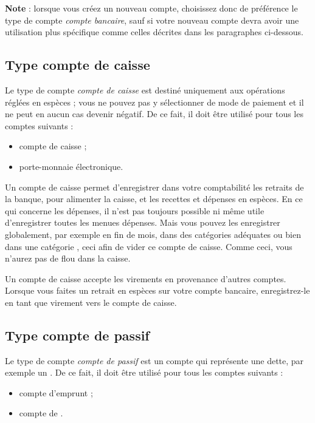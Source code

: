 \textbf{Note} : lorsque vous créez un nouveau compte, choisissez donc de préférence le type de compte \emph{compte bancaire}, sauf si votre nouveau compte devra avoir une utilisation plus spécifique comme celles décrites dans les paragraphes ci-dessous.


\subsection{Type compte de caisse\label{accounts-type-cash}}

Le type de compte \emph{compte de caisse} est destiné uniquement aux opérations réglées en espèces ; vous ne pouvez pas y sélectionner de mode de paiement et il ne peut en aucun cas devenir négatif. De ce fait, il doit être utilisé pour tous les comptes suivants :
\begin{itemize}
	\item compte de caisse ;
	\item porte-monnaie électronique. 
\end{itemize}

Un compte de caisse permet d'enregistrer dans votre comptabilité les retraits de la banque, pour alimenter la caisse, et les recettes et dépenses en espèces. En ce qui concerne les dépenses, il n’est pas toujours possible ni même utile d’enregistrer toutes les menues dépenses. Mais vous pouvez les enregistrer globalement, par exemple en fin de mois, dans des catégories adéquates ou bien dans une catégorie , ceci afin de vider ce compte de caisse. Comme ceci, vous n’aurez pas de flou dans la caisse.

Un compte de caisse accepte les virements en provenance d'autres comptes. Lorsque vous faites un retrait en espèces sur votre compte bancaire, enregistrez-le en tant que virement vers le compte de caisse.


\subsection{Type compte de passif\label{accounts-type-liabilities}}

Le type de compte \emph{compte de passif} est un compte qui représente une dette, par exemple un . De ce fait, il doit être utilisé pour tous les comptes suivants :

\begin{itemize}
	\item compte d'emprunt ;
	\item compte de .
	
\end{itemize}


